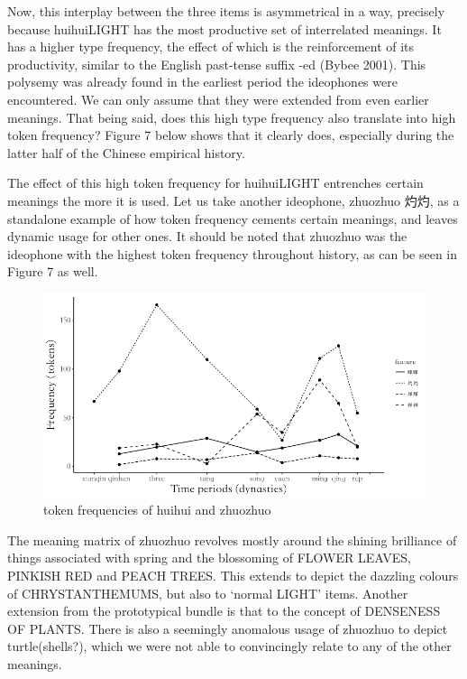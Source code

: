 \documentclass[12pt,article,oneside]{memoir}
\theoremstyle{definition}
\theoremstyle{definition}
\theoremstyle{definition}
\theoremstyle{remark}
\begin{document}
Now, this interplay between the three items is asymmetrical in a way,
precisely because huihuiLIGHT has the most productive set of
interrelated meanings. It has a higher type frequency, the effect of
which is the reinforcement of its productivity, similar to the English
past-tense suffix -ed (Bybee 2001). This polysemy was already found in
the earliest period the ideophones were encountered. We can only assume
that they were extended from even earlier meanings. That being said,
does this high type frequency also translate into high token frequency?
Figure 7 below shows that it clearly does, especially during the latter
half of the Chinese empirical history.

The effect of this high token frequency for huihuiLIGHT entrenches
certain meanings the more it is used. Let us take another ideophone,
zhuozhuo 灼灼, as a standalone example of how token frequency cements
certain meanings, and leaves dynamic usage for other ones. It should be
noted that zhuozhuo was the ideophone with the highest token frequency
throughout history, as can be seen in Figure 7 as well.

\begin{figure}
\includegraphics[width=11.11in]{ideos/huihuizhuozhuo} \caption{token frequencies of huihui and zhuozhuo}\label{fig:huizhuo}
\end{figure}

The meaning matrix of zhuozhuo revolves mostly around the shining
brilliance of things associated with spring and the blossoming of FLOWER
LEAVES, PINKISH RED and PEACH TREES. This extends to depict the dazzling
colours of CHRYSTANTHEMUMS, but also to `normal LIGHT' items. Another
extension from the prototypical bundle is that to the concept of
DENSENESS OF PLANTS. There is also a seemingly anomalous usage of
zhuozhuo to depict turtle(shells?), which we were not able to
convincingly relate to any of the other meanings.
\end{document}
